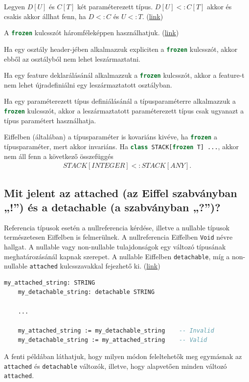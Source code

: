 	Legyen $D[U]$ és $C[T]$ két paraméterezett típus. $D[U]<:C[T]$ akkor és csakis akkor állhat fenn, ha $D<:C$ és $U<:T$. (\href{https://www.eiffel.org/doc/eiffel/ET-_Inheritance#Polymorphism}{link})

	A \lstinline[language=Eiffel]|frozen| kulcsszót háromféleképpen használhatjuk. (\href{https://www.eiffel.org/doc/eiffel/Eiffel_programming_language_reserved_words#frozen}{link})
	
	Ha egy osztály header-jében alkalmazzuk expliciten a \lstinline[language=Eiffel]|frozen| kulcsszót, akkor ebből az osztályból nem lehet leszármaztatni.
	
	Ha egy feature deklarálásánál alkalmazzuk a \lstinline[language=Eiffel]|frozen| kulcsszót, akkor a feature-t nem lehet újradefiniálni egy leszármaztatott osztályban.
	
	Ha egy paraméterezett típus definiálásánál a típusparaméterre alkalmazzuk  a \lstinline[language=Eiffel]|frozen| kulcsszót, akkor a leszármaztatott paraméterezett típus csak ugyanazt a típus paramétert használhatja.
	
	Eiffelben (általában) a típusparaméter is kovariáns kivéve, ha \lstinline[language=Eiffel]|frozen| a típusparaméter, mert akkor invariáns. Ha \lstinline[language=Eiffel]|class STACK[frozen T] ...|, akkor nem áll fenn a következő összefüggés
	\begin{align*}
	STACK[INTEGER] <: STACK[ANY].
	\end{align*}
	
\subsection{ Mit jelent az attached (az Eiffel szabványban „!”) és a detachable (a szabványban „?”)? }
	Referencia típusok esetén a nullreferencia kérdése, illetve a nullable típusok természetesen Eiffelben is felmerülnek. A nullreferencia Eiffelben \lstinline[language=Eiffel]|Void| névre hallgat. A nullable vagy non-nullable tulajdonságok egy változó típusának meghatározásánál kapnak szerepet. A nullable Eiffelben \lstinline[language=Eiffel]|detachable|, míg a non-nullable \lstinline[language=Eiffel]|attached| kulcsszavakkal fejezhető ki. (\href{https://www.eiffel.org/doc/eiffel/Void-safety-_Background\%2C_definition\%2C_and_tools}{link})
	
	\begin{lstlisting}[language=Eiffel]
	my_attached_string: STRING
	my_detachable_string: detachable STRING
	
	...
	
	my_attached_string := my_detachable_string    -- Invalid
	my_detachable_string := my_attached_string    -- Valid
	\end{lstlisting}
	A fenti példában láthatjuk, hogy milyen módon feleltehetők meg egymásnak az \lstinline[language=Eiffel]|attached| és \lstinline[language=Eiffel]|detachable| változók, illetve, hogy alapvetően minden változó \lstinline[language=Eiffel]|attached|.
	
